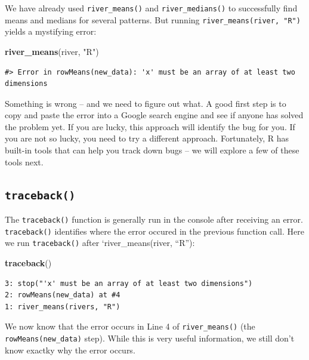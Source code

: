 \documentclass[
]{book}
\newenvironment{Shaded}{\begin{snugshade}}{\end{snugshade}}
\newcommand{\KeywordTok}[1]{\textcolor[rgb]{0.13,0.29,0.53}{\textbf{#1}}}
\newcommand{\NormalTok}[1]{#1}
\newcommand{\StringTok}[1]{\textcolor[rgb]{0.31,0.60,0.02}{#1}}
\begin{document}
We have already used \texttt{river\_means()} and \texttt{river\_medians()} to successfully find means and medians for several patterns. But running \texttt{river\_means(river,\ "R")} yields a mystifying error:

\begin{Shaded}
\begin{Highlighting}[]
\KeywordTok{river_means}\NormalTok{(river, }\StringTok{"R"}\NormalTok{)}
\end{Highlighting}
\end{Shaded}

\begin{verbatim}
#> Error in rowMeans(new_data): 'x' must be an array of at least two dimensions
\end{verbatim}

Something is wrong -- and we need to figure out what. A good first step is to copy and paste the error into a Google search engine and see if anyone has solved the problem yet. If you are lucky, this approach will identify the bug for you. If you are not so lucky, you need to try a different approach. Fortunately, R has built-in tools that can help you track down bugs -- we will explore a few of these tools next.

\hypertarget{traceback}{%
\subsection{\texorpdfstring{\texttt{traceback()}}{traceback()}}\label{traceback}}

The \texttt{traceback()} function is generally run in the console after receiving an error. \texttt{traceback()} identifies where the error occured in the previous function call. Here we run \texttt{traceback()} after `river\_means(river, ``R''):

\begin{Shaded}
\begin{Highlighting}[]
\KeywordTok{traceback}\NormalTok{()}
\end{Highlighting}
\end{Shaded}

\begin{verbatim}
3: stop("'x' must be an array of at least two dimensions")
2: rowMeans(new_data) at #4
1: river_means(rivers, "R")
\end{verbatim}

We now know that the error occurs in Line 4 of \texttt{river\_means()} (the \texttt{rowMeans(new\_data)} step). While this is very useful information, we still don't know exactky why the error occurs.
\end{document}
